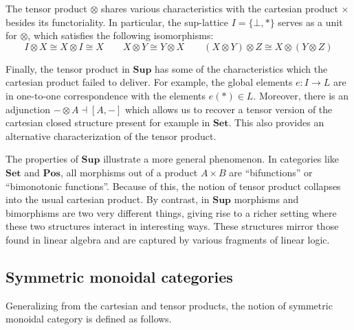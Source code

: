 \documentclass[11pt,oneside,draft]{book}
\theoremstyle{definition}
\begin{document}
The tensor product $\otimes$ shares
various characteristics
with the cartesian product $\times$
besides its functoriality.
In particular,
the sup-lattice $I = \{ \bot, * \}$ 
serves as a unit for $\otimes$,
which satisfies the following isomorphisms:
\[
  I \otimes X \cong X \otimes I \cong X
  \qquad
  X \otimes Y \cong Y \otimes X
  \qquad
  (X \otimes Y) \otimes Z \cong X \otimes (Y \otimes Z)
\]

Finally,
the tensor product in $\mathbf{Sup}$
has some of the characteristics
which the cartesian product failed to deliver.
For example,
the global elements $e : I \rightarrow L$
are in one-to-one correspondence
with the elements $e(*) \in L$.
Moreover,
there is an adjunction
$- \otimes A \dashv [A, -]$
which allows us to recover a tensor version
of the cartesian closed structure
present for example in $\mathbf{Set}$.
This also provides an alternative characterization
of the tensor product.

The properties of $\mathbf{Sup}$
illustrate a more general phenomenon.
In categories like $\mathbf{Set}$ and $\mathbf{Pos}$,
all morphisms out of a product $A \times B$
are ``bifunctions'' or ``bimonotonic functions''.
Because of this,
the notion of tensor product collapses into
the usual cartesian product.
By contrast,
in $\mathbf{Sup}$ morphisms and bimorphisms
are two very different things,
giving rise to a richer setting
where these two structures
interact in interesting ways.
These structures mirror those found in linear algebra
and are captured by various fragments of linear logic.


\subsection{Symmetric monoidal categories} %

Generalizing from the cartesian and tensor products,
the notion of symmetric monoidal category
is defined as follows.
\end{document}
